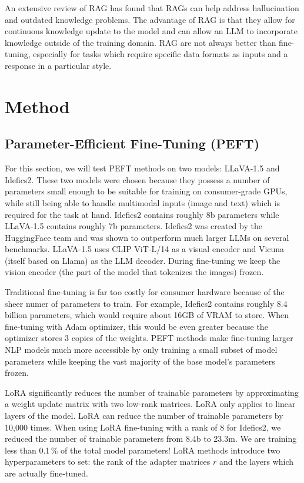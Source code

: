 \documentclass{article}
\begin{document}
An extensive review of RAG \cite{ragreview} has found that RAGs can help address hallucination and outdated knowledge problems. The advantage of RAG is that they allow for continuous knowledge update to the model and can allow an LLM to incorporate knowledge outside of the training domain. RAG are not always better than fine-tuning, especially for tasks which require specific data formats as inputs and a response in a particular style.\par



\section{Method}
\label{sec:method}

\subsection{Parameter-Efficient Fine-Tuning (PEFT)}
For this section, we will test PEFT methods on two models: LLaVA-1.5\cite{liu2023llava} and Idefics2\cite{idefics2}. These
two models were chosen because they possess a number of parameters small enough to be suitable for training on consumer-grade GPUs, while still being able to handle multimodal inputs (image and text) which is required for the task at hand. Idefics2 contains roughly 8b parameters while LLaVA-1.5 contains roughly 7b parameters. Idefics2 was created by the HuggingFace team and was shown to outperform much larger LLMs on several benchmarks. LLaVA-1.5 uses CLIP ViT-L/14 as a visual encoder and Vicuna (itself based on Llama) as the LLM decoder. During fine-tuning we keep the vision encoder (the part of the model that tokenizes the images) frozen.\par

Traditional fine-tuning is far too costly for consumer hardware because of the sheer numer of parameters to train. For example, Idefics2 contains roughly 8.4 billion parameters, which would require about 16GB of VRAM to store. When fine-tuning with Adam optimizer, this would be even greater because the optimizer stores 3 copies of the weights. PEFT methods make fine-tuning larger NLP models much more accessible by only training a small subset of model parameters while keeping the vast majority of the base model's parameters frozen.\par

LoRA significantly reduces the number of trainable parameters by approximating a weight update matrix with two low-rank matrices. LoRA only applies to linear layers of the model. LoRA can reduce the number of trainable parameters by 10,000 times. When using LoRA fine-tuning with a rank of 8 for Idefics2, we reduced the number of trainable parameters from 8.4b to 23.3m. We are training less than 0.1\,\% of the total model parameters! LoRA methods introduce two hyperparameters to set: the rank of the adapter matrices $r$ and the layers which are actually fine-tuned.\par
\end{document}
